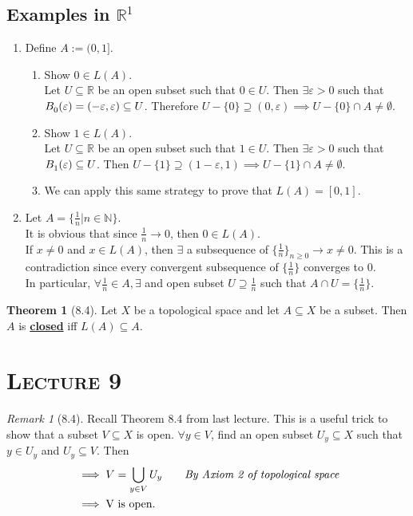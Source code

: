 \documentclass{article}
\newcommand{\R}{\ensuremath{\mathbb{R}}}
\newcommand{\N}{\ensuremath{\mathbb{N}}}
\newcommand{\oBall}[3][\empty]{\ensuremath{B^{#1}_{#2}(#3)}}
\newcommand{\define}[1]{\textbf{\underline{#1}}}
\newcommand{\ts}{\text topological space}
\newcommand{\es}{\ensuremath{\emptyset}}
\newcommand{\Union}{\bigcup}
\newcommand{\inter}{\cap}
\renewcommand{\Subset}{\subseteq}
\renewcommand{\Supset}{\supseteq}
\theoremstyle{definition}
\newtheorem*{theorem}{Theorem}
\theoremstyle{remark}
\newtheorem*{remark}{Remark}
\begin{document}
        \subsection*{Examples in $\R^1$}
            \begin{enumerate}
                \item Define $A := (0,1]$.
                \begin{enumerate}
                    \item Show $0 \in L(A)$.\\
                    Let $U \Subset \R$ be an open subset such that $0 \in U$. Then $\exists\varepsilon > 0$ such that $\oBall{0}{\varepsilon} = (-\varepsilon, \varepsilon) \Subset U$. Therefore $U - \{0\} \Supset (0, \varepsilon) \implies U-\{0\} \inter A \neq \es$.
                    \item Show $1 \in L(A)$.\\
                    Let $U \Subset \R$ be an open subset such that $1 \in U$. Then $\exists\varepsilon > 0$ such that $\oBall{1}{\varepsilon} \Subset U$. Then $U - \{1\} \Supset (1-\varepsilon, 1) \implies U-\{1\} \inter A \neq \es$.
                    \item We can apply this same strategy to prove that $L(A) = [0,1]$.
                \end{enumerate}
                \item Let $A = \{\frac{1}{n} | n \in \N\}$.\\
                It is obvious that since $\frac{1}{n} \to 0$, then $0 \in L(A)$.\\
                If $x \neq 0$ and $x \in L(A)$, then $\exists$ a subsequence of $\{\frac{1}{n}\}_{n \geq 0} \to x \neq 0$. This is a contradiction since every convergent subsequence of $\{\frac{1}{n}\}$ converges to $0$.\\
                In particular, $\forall \frac{1}{n} \in A, \exists$ and open subset $U \Supset \frac{1}{n}$ such that $A \inter U = \{\frac{1}{n}\}$.
            \end{enumerate}
            \begin{theorem}[8.4]
                Let $X$ be a \ts{} and let $A \Subset X$ be a subset. Then $A$ is \define{closed} iff $L(A) \Subset A$.
            \end{theorem}
        
    \section*{\textbf{\textsc{Lecture 9}}}
    \begin{remark}[8.4]
        Recall Theorem 8.4 from last lecture. This is a useful trick to show that a subset $V \Subset X$ is open. $\forall y \in V$, find an open subset $U_y \Subset X$ such that $y \in U_y$ and $U_y \Subset V$. Then
            \begin{align*}
                &\implies V = \Union_{y \in V} U_y     \qquad\textit{By Axiom 2 of \ts{}}\\
                &\implies \text{V is open.}
            \end{align*}
    \end{remark}
    
\end{document}
